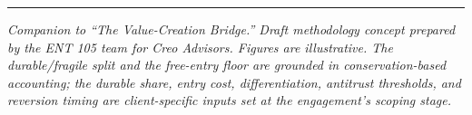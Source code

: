\documentclass[11pt]{article}
\begin{document}
\vspace{6pt}\hrule\vspace{5pt}
{\footnotesize\itshape Companion to ``The Value-Creation Bridge.'' Draft methodology concept
prepared by the ENT 105 team for Creo Advisors. Figures are illustrative. The durable/fragile split
and the free-entry floor are grounded in conservation-based accounting; the durable share, entry cost, differentiation, antitrust thresholds, and
reversion timing are client-specific inputs set at the engagement's scoping stage.}
\end{document}
